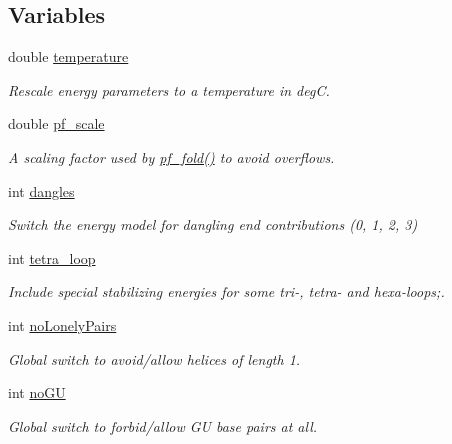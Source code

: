 \subsection*{Variables}
\begin{DoxyCompactItemize}
\item 
double \mbox{\hyperlink{group__model__details_gab4b11c8d9c758430960896bc3fe82ead}{temperature}}
\begin{DoxyCompactList}\small\item\em Rescale energy parameters to a temperature in degC. \end{DoxyCompactList}\item 
double \mbox{\hyperlink{group__model__details_gad3b22044065acc6dee0af68931b52cfd}{pf\+\_\+scale}}
\begin{DoxyCompactList}\small\item\em A scaling factor used by \mbox{\hyperlink{group__pf__fold_gadc3db3d98742427e7001a7fd36ef28c2}{pf\+\_\+fold()}} to avoid overflows. \end{DoxyCompactList}\item 
int \mbox{\hyperlink{group__model__details_ga72b511ed1201f7e23ec437e468790d74}{dangles}}
\begin{DoxyCompactList}\small\item\em Switch the energy model for dangling end contributions (0, 1, 2, 3) \end{DoxyCompactList}\item 
int \mbox{\hyperlink{group__model__details_ga4f6265bdf0ead7ff4628a360adbfd77e}{tetra\+\_\+loop}}
\begin{DoxyCompactList}\small\item\em Include special stabilizing energies for some tri-\/, tetra-\/ and hexa-\/loops;. \end{DoxyCompactList}\item 
int \mbox{\hyperlink{group__model__details_ga097eccaabd6ae8b4fef83cccff85bb5d}{no\+Lonely\+Pairs}}
\begin{DoxyCompactList}\small\item\em Global switch to avoid/allow helices of length 1. \end{DoxyCompactList}\item 
int \mbox{\hyperlink{group__model__details_gabf380d09e4f1ab94fc6af57cf0ad5d32}{no\+GU}}
\begin{DoxyCompactList}\small\item\em Global switch to forbid/allow GU base pairs at all. \end{DoxyCompactList}\item 

\end{DoxyCompactItemize}
